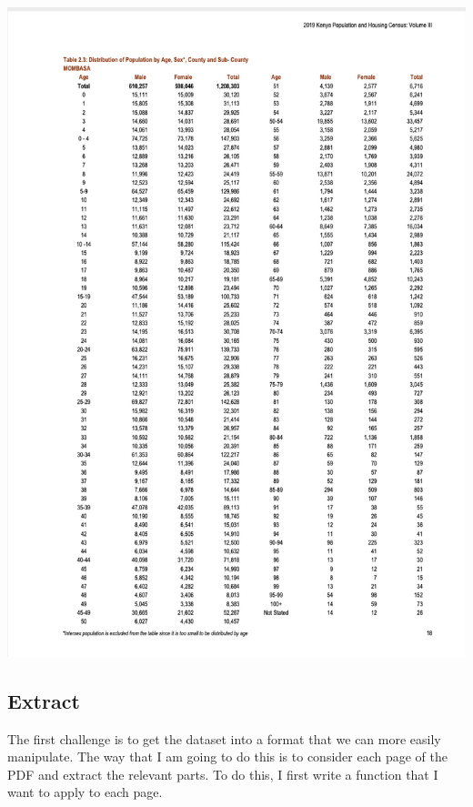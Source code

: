 \documentclass[
]{book}
\begin{document}
\includegraphics[width=0.85\linewidth]{figures/2020-04-10-screenshot-of-census}

\hypertarget{extract}{%
\subsection{Extract}\label{extract}}

The first challenge is to get the dataset into a format that we can more easily manipulate. The way that I am going to do this is to consider each page of the PDF and extract the relevant parts. To do this, I first write a function that I want to apply to each page.
\end{document}
